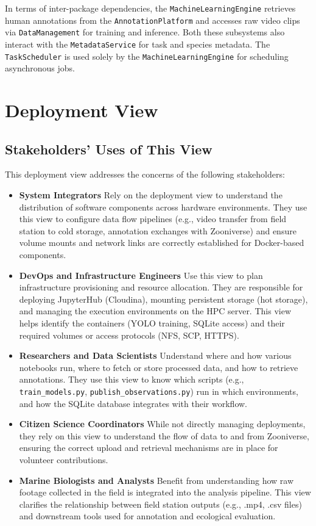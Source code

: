 In terms of inter-package dependencies, the \texttt{MachineLearningEngine} retrieves human annotations from the \texttt{AnnotationPlatform} and accesses raw video clips via \texttt{DataManagement} for training and inference. Both these subsystems also interact with the \texttt{MetadataService} for task and species metadata. The \texttt{TaskScheduler} is used solely by the \texttt{MachineLearningEngine} for scheduling asynchronous jobs.

\section{Deployment View}

\subsection{Stakeholders’ Uses of This View}

This deployment view addresses the concerns of the following stakeholders:

\begin{itemize}
  \item \textbf{System Integrators} 
Rely on the deployment view to understand the distribution of software components across hardware environments. They use this view to configure data flow pipelines (e.g., video transfer from field station to cold storage, annotation exchanges with Zooniverse) and ensure volume mounts and network links are correctly established for Docker-based components.

\item \textbf{DevOps and Infrastructure Engineers} 
Use this view to plan infrastructure provisioning and resource allocation. They are responsible for deploying JupyterHub (Cloudina), mounting persistent storage (hot storage), and managing the execution environments on the HPC server. This view helps identify the containers (YOLO training, SQLite access) and their required volumes or access protocols (NFS, SCP, HTTPS).

\item \textbf{Researchers and Data Scientists} 
Understand where and how various notebooks run, where to fetch or store processed data, and how to retrieve annotations. They use this view to know which scripts (e.g., \texttt{train\_models.py}, \texttt{publish\_observations.py}) run in which environments, and how the SQLite database integrates with their workflow.

\item \textbf{Citizen Science Coordinators} 
While not directly managing deployments, they rely on this view to understand the flow of data to and from Zooniverse, ensuring the correct upload and retrieval mechanisms are in place for volunteer contributions.

\item \textbf{Marine Biologists and Analysts} 
Benefit from understanding how raw footage collected in the field is integrated into the analysis pipeline. This view clarifies the relationship between field station outputs (e.g., .mp4, .csv files) and downstream tools used for annotation and ecological evaluation.
\end{itemize}

